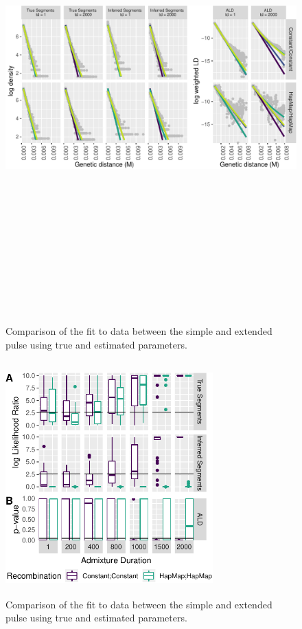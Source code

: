 \documentclass[11pt]{article}
\begin{document}
\begin{figure}
\centering
\includegraphics[width=16cm,height=18cm,keepaspectratio]{ATE_Revisions_files/figure-latex/figResult2_2-1.pdf}
\caption{\label{fig:fig3_2} Comparison of the fit to data between the simple and extended pulse using true and estimated parameters. }
\end{figure}

\begin{figure}
\centering
\includegraphics[width=8cm,height=9cm,keepaspectratio]{ATE_Revisions_files/figure-latex/figResult2_3-1.pdf}
\caption{\label{fig:fig3_3} Comparison of the fit to data between the simple and extended pulse using true and estimated parameters. }
\end{figure}
\end{document}
